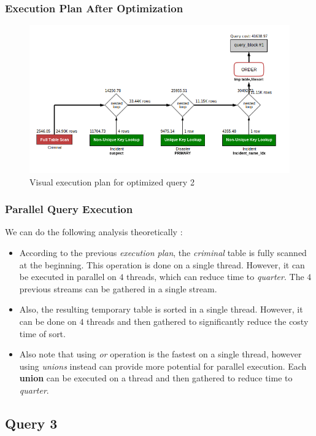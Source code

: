 \subsubsection{Execution Plan After Optimization}
\begin{figure}[H]
    \centering
    \includegraphics[width=\textwidth]{images/execution_plans/q2-4-new.png}
    \caption{Visual execution plan for optimized query 2}
\end{figure}

\subsubsection{Parallel Query Execution}
We can do the following analysis theoretically :
\begin{itemize}
    \item According to the previous \emph{execution plan}, the \emph{criminal} table is fully scanned at the beginning. This operation is done on a single thread. However, it can be executed in parallel on $4$ threads, which can reduce time to \emph{quarter}. The $4$ previous streams can be gathered in a single stream.
    \item Also, the resulting temporary table is sorted in a single thread. However, it can be done on $4$ threads and then gathered to significantly reduce the costy time of sort.
    \item Also note that using \emph{or} operation is the fastest on a single thread, however using 
    \emph{unions} instead can provide more potential for parallel execution. Each \textbf{union} can be executed on a thread and then gathered to reduce time to \emph{quarter}.
\end{itemize}

\subsection{Query 3}

